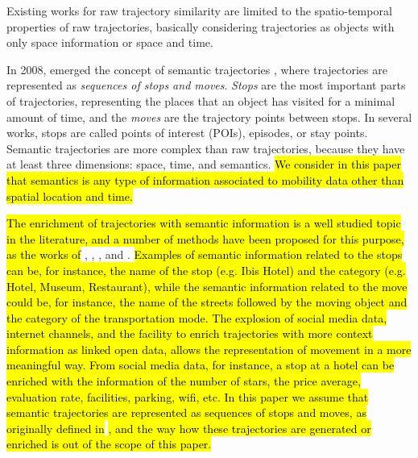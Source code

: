 \documentclass[12pt]{article}
\begin{document}
Existing works for raw trajectory similarity are limited to the spatio-temporal properties of raw trajectories, basically considering trajectories as objects with only space information or space and time.

In 2008, emerged the concept of semantic trajectories \citep{Spaccapietra:2008:CVT:1347466.1347785}, where trajectories are represented as \emph{sequences of stops and moves}. \emph{Stops} are the most important parts of trajectories, representing the places that an object has visited for a minimal amount of time, and the \emph{moves} are the trajectory points between stops. In several works, stops are called points of interest (POIs), episodes, or stay points. Semantic trajectories are more complex than raw trajectories, because they have at least three dimensions: space, time, and semantics. \hl{We consider in this paper that semantics is any type of information associated to mobility data other than spatial location and time.}

\hl{The enrichment of trajectories with semantic information is a well studied topic in the literature, and a number of methods have been proposed for this purpose, as the works of} \cite{alvares2007model}, \cite{Palma2008}, \cite{manso}, and \cite{fileto2013baquara}. \hl{Examples of semantic information related to the stops can be, for instance, the name of the stop (e.g. Ibis Hotel) and the category (e.g. Hotel, Museum, Restaurant), while the semantic information related to the move could be, for instance, the name of the streets followed by the moving object and the category of the transportation mode. The explosion of social media data, internet channels, and the facility to enrich trajectories with more context information as linked open data, allows the representation of movement in a more meaningful way. From social media data, for instance, a stop at a hotel can be enriched with the information of the number of stars, the price average, evaluation rate, facilities, parking, wifi, etc.  In this paper we assume that semantic trajectories are represented as sequences of stops and moves, as originally defined in }\cite{Spaccapietra:2008:CVT:1347466.1347785}\hl{, and the way how these trajectories are generated or enriched is out of the scope of this paper.}
\end{document}
